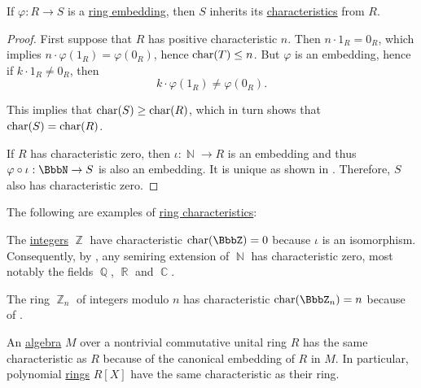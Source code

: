 \begin{proposition}\label{thm:ring_embedding_preserves_characterstic}
  If \( \varphi: R \to S \) is a \hyperref[def:ring/homomorphism]{ring embedding}, then \( S \) inherits its \hyperref[def:semiring_characteristic]{characteristics} from \( R \).
\end{proposition}
\begin{proof}
  First suppose that \( R \) has positive characteristic \( n \). Then \( n \cdot 1_R = 0_R \), which implies \( n \cdot \varphi(1_R) = \varphi(0_R) \), hence \( \operatorname{char}(T) \leq n \). But \( \varphi \) is an embedding, hence if \( k \cdot 1_R \neq 0_R \), then
  \begin{equation*}
    k \cdot \varphi(1_R) \neq \varphi(0_R).
  \end{equation*}

  This implies that \( \operatorname{char}(S) \geq \operatorname{char}(R) \), which in turn shows that \( \operatorname{char}(S) = \operatorname{char}(R) \).

  If \( R \) has characteristic zero, then \( \iota: \BbbN \to R \) is an embedding and thus \( \varphi \bincirc \iota: \BbbN \to S \) is also an embedding. It is unique as shown in . Therefore, \( S \) also has characteristic zero.
\end{proof}

\begin{example}\label{ex:def:ring_characteristic}
  The following are examples of \hyperref[def:ring_characteristic]{ring characteristics}:
  \begin{thmenum}
     The \hyperref[def:set_of_integers]{integers} \( \BbbZ \) have characteristic \( \op{char}(\BbbZ) = 0 \) because \( \iota \) is an isomorphism. Consequently, by , any semiring extension of \( \BbbN \) has characteristic zero, most notably the fields \( \BbbQ \), \( \BbbR \) and \( \BbbC \).

     The ring \hyperref[thm:ring_of_integers_modulo]{\( \BbbZ_n \)} of integers modulo \( n \) has characteristic \( \op{char}(\BbbZ_n) = n \) because of .

     An \hyperref[def:algebra_over_semiring]{algebra} \( M \) over a nontrivial commutative unital ring \( R \) has the same characteristic as \( R \) because of the canonical embedding of \( R \) in \( M \). In particular, polynomial \hyperref[def:algebra_of_polynomials]{rings} \( R[X] \) have the same characteristic as their ring.
  \end{thmenum}
\end{example}

